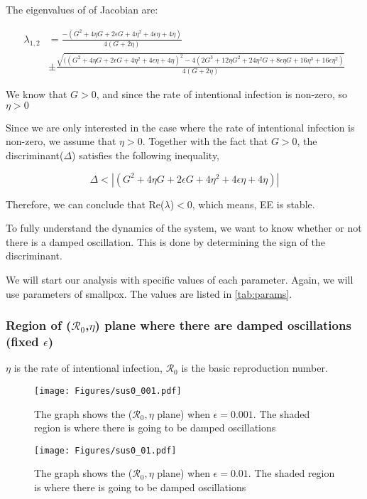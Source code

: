 \documentclass[12pt]{article}
\newcommand{\R}{\mathcal{R}}
\begin{document}
The eigenvalues of of Jacobian are:

\begin{linenomath*}
\begin{align}
\lambda_{1,2} &= \frac{-(G^2+4\eta G+2\epsilon G+4\eta^2+4\epsilon\eta+4\eta) }{4(G+2\eta)}\\
& \pm \frac{\sqrt{((G^2+4\eta G+2\epsilon G+4\eta^2+4\epsilon\eta+4\eta)^2-4(2G^3+12\eta G^2+24\eta^2 G+8\epsilon\eta G+16\eta^3+16\epsilon\eta^2)}}{4(G+2\eta)}
\end{align}
\end{linenomath*}

We know that $G>0$, and since the rate of intentional infection is non-zero, so $\eta >0$

Since we are only interested in the case where the rate of intentional infection is non-zero, we assume that $\eta>0$. Together with the fact that $G>0$, the discriminant($\Delta$) satisfies the following inequality,
\begin{linenomath*}
\begin{equation}
\Delta<|(G^2+4\eta G+2\epsilon G+4\eta^2+4\epsilon\eta+4\eta)|
\end{equation}
\end{linenomath*}

Therefore, we can conclude that Re($\lambda$)$<0$, which means, EE is stable.

To fully understand the dynamics of the system, we want to know whether or not there is a damped oscillation. This is done by determining the sign of the discriminant.

We will start our analysis with specific values of each parameter. Again, we will use parameters of smallpox. The values are listed in \autoref{tab:params}.
\subsubsection{Region of ($\R_0$,$\eta$) plane where there are damped oscillations (fixed $\epsilon$)}

$\eta$ is the rate of intentional infection, $\R_0$ is the basic reproduction number.
\begin{figure}[H]
  \centering
  \texttt{[image: Figures/sus0\_001.pdf]}
  \caption{The graph shows the ($\R_0,\eta$ plane) when $\epsilon=0.001$. The shaded region is where there is going to be damped oscillations}
\end{figure}

\begin{figure}[H]
  \centering
  \texttt{[image: Figures/sus0\_01.pdf]}
  \caption{The graph shows the ($\R_0,\eta$ plane) when $\epsilon=0.01$. The shaded region is where there is going to be damped oscillations}
\end{figure}
\end{document}
